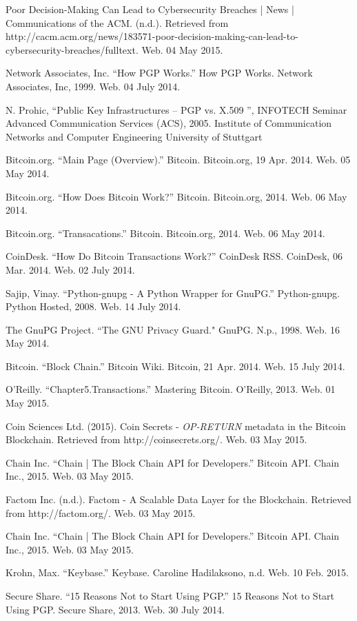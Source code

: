 \documentclass{llncs}
\begin{document}
\begin{thebibliography}{5}
Poor Decision-Making Can Lead to Cybersecurity Breaches | News | Communications of the ACM. (n.d.). Retrieved from http://cacm.acm.org/news/183571-poor-decision-making-can-lead-to-cybersecurity-breaches/fulltext. Web. 04 May 2015. 

Network Associates, Inc. ``How PGP Works.'' How PGP Works. Network Associates, Inc, 1999. Web. 04 July 2014. 

N. Prohic, ``Public Key Infrastructures – PGP vs. X.509 '', INFOTECH Seminar Advanced Communication Services (ACS), 2005.  Institute of Communication Networks and Computer Engineering University of Stuttgart 

Bitcoin.org. ``Main Page (Overview).'' Bitcoin. Bitcoin.org, 19 Apr. 2014. Web. 05 May 2014.

Bitcoin.org. ``How Does Bitcoin Work?'' Bitcoin. Bitcoin.org, 2014. Web. 06 May 2014.

Bitcoin.org. ``Transacations.'' Bitcoin. Bitcoin.org, 2014. Web. 06 May 2014.

CoinDesk. ``How Do Bitcoin Transactions Work?'' CoinDesk RSS. CoinDesk, 06 Mar. 2014. Web. 02 July 2014.

Sajip, Vinay. ``Python-gnupg - A Python Wrapper for GnuPG.'' Python-gnupg. Python Hosted, 2008. Web. 14 July 2014.

The GnuPG Project. ``The GNU Privacy Guard." GnuPG. N.p., 1998. Web. 16 May 2014.

Bitcoin. ``Block Chain.'' Bitcoin Wiki. Bitcoin, 21 Apr. 2014. Web. 15 July 2014. 

O'Reilly. ``Chapter5.Transactions.'' Mastering Bitcoin. O'Reilly, 2013. Web. 01 May 2015.

Coin Sciences Ltd. (2015). Coin Secrets - \textit{OP-RETURN} metadata in the Bitcoin Blockchain. Retrieved from http://coinsecrets.org/. Web. 03 May 2015.


Chain Inc. ``Chain | The Block Chain API for Developers.'' Bitcoin API. Chain Inc., 2015. Web. 03 May 2015.

Factom Inc. (n.d.). Factom - A Scalable Data Layer for the Blockchain. Retrieved from http://factom.org/. Web. 03 May 2015.

Chain Inc. ``Chain | The Block Chain API for Developers.'' Bitcoin API. Chain Inc., 2015. Web. 03 May 2015.

Krohn, Max. ``Keybase.'' Keybase. Caroline Hadilaksono, n.d. Web. 10 Feb. 2015.

Secure Share. ``15 Reasons Not to Start Using PGP.'' 15 Reasons Not to Start Using PGP. Secure Share, 2013. Web. 30 July 2014.

\end{thebibliography}
\end{document}
